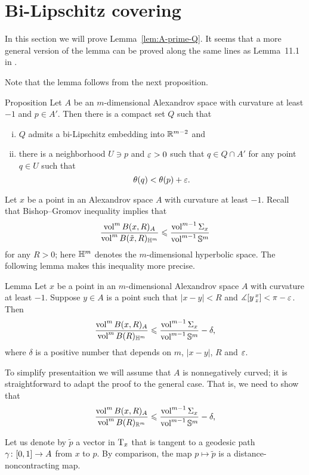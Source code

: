 \section{Bi-Lipschitz covering}\label{sec:bilip}

In this section we will prove Lemma~\ref{lem:A-prime-Q}.
It seems that a more general version of the lemma can be proved along the same lines as Lemma~11.1 in \cite{simon}.

Note that the lemma follows from the next proposition.


\begin{thm}{Proposition}\label{prop:Q-covering}
Let $A$ be an $m$-dimensional Alexandrov space with curvature at least $-1$ and $p\in A'$.
Then there is a compact set $Q$ such that 
\begin{enumerate}[(i)]
 \item $Q$ admits a bi-Lipschitz embedding into $\mathbb{R}^{m-2}$ and
 \item there is a neighborhood $U\ni p$ and $\varepsilon>0$ such that $q\in Q\cap A'$ for any point $q\in U$ such that 
 \[\theta(q)<\theta(p)+\varepsilon.\]
\end{enumerate}
\end{thm}

Let $x$ be a point in an Alexandrov space $A$ with curvature at least $-1$.
Recall that Bishop--Gromov inequality implies that 
\[\frac{\operatorname{vol}^m B(x,R)_A}{\operatorname{vol}^m B(\tilde x,R)_{\mathbb{H}^m}}\leqslant \frac{\operatorname{vol}^{m-1} \Sigma_x}{\operatorname{vol}^{m-1} \mathbb{S}^m}\]
for any $R>0$; here $\mathbb{H}^m$ denotes the $m$-dimensional hyperbolic space.
The following lemma makes this inequality more precise. 

\begin{thm}{Lemma}
Let $x$ be a point in an $m$-dimensional Alexandrov space $A$ with curvature at least $-1$.
Suppose $y\in A$ is a point such that $|x-y|<R$ and $\measuredangle[y\,{}^{x}_{z}]<\pi-\varepsilon$.
Then
\[\frac{\operatorname{vol}^m B(x,R)_A}{\operatorname{vol}^m B(R)_{\mathbb{H}^m}}\leqslant \frac{\operatorname{vol}^{m-1} \Sigma_x}{\operatorname{vol}^{m-1} \mathbb{S}^m}-\delta,\]
where $\delta$ is a positive number that depends on $m$, $|x-y|$, $R$ and $\varepsilon$.
 
\end{thm}

To simplify presentaition we will assume that $A$ is nonnegatively curved;
it is straightforward to adapt the proof to the general case.
That is, we need to show that 
\[\frac{\operatorname{vol}^m B(x,R)_A}{\operatorname{vol}^m B(R)_{\mathbb{R}^m}}\leqslant \frac{\operatorname{vol}^{m-1} \Sigma_x}{\operatorname{vol}^{m-1} \mathbb{S}^m}-\delta,\]

Let us denote by $\tilde p$ a vector in $\mathrm{T}_x$ that is tangent to a geodesic path $\gamma\:[0,1]\zz\to A$ from $x$ to $p$.
By comparison, the map $p\mapsto \tilde p$ is a distance-noncontracting map.

